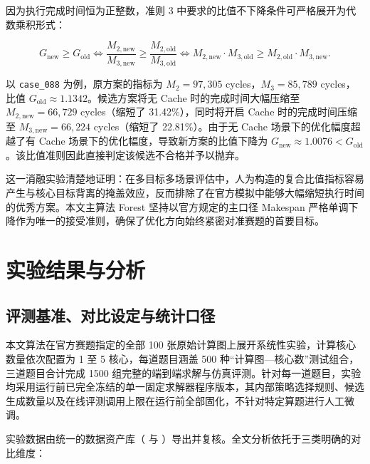 \documentclass[anonymous,notoc]{gmcm2026}
\begin{document}
因为执行完成时间恒为正整数，准则 3 中要求的比值不下降条件可严格展开为代数乘积形式：

\begin{equation}
G_{\mathrm{new}} \ge G_{\mathrm{old}} \iff \frac{M_{2, \mathrm{new}}}{M_{3, \mathrm{new}}} \ge \frac{M_{2, \mathrm{old}}}{M_{3, \mathrm{old}}} \iff M_{2, \mathrm{new}} \cdot M_{3, \mathrm{old}} \ge M_{2, \mathrm{old}} \cdot M_{3, \mathrm{new}}.
\end{equation}

以 \texttt{case\_088} 为例，原方案的指标为 \(M_2 = 97{,}305\) cycles，\(M_3 = 85{,}789\) cycles，比值 \(G_{\mathrm{old}} \approx 1.1342\)。候选方案将无 Cache 时的完成时间大幅压缩至 \(M_{2, \mathrm{new}} = 66{,}729\) cycles（缩短了 31.42\%），同时将开启 Cache 时的完成时间压缩至 \(M_{3, \mathrm{new}} = 66{,}224\) cycles（缩短了 22.81\%）。由于无 Cache 场景下的优化幅度超越了有 Cache 场景下的优化幅度，导致新方案的比值下降为 \(G_{\mathrm{new}} \approx 1.0076 < G_{\mathrm{old}}\)。该比值准则因此直接判定该候选不合格并予以抛弃。

这一消融实验清楚地证明：在多目标多场景评估中，人为构造的复合比值指标容易产生与核心目标背离的掩盖效应，反而排除了在官方模拟中能够大幅缩短执行时间的优秀方案。本文主算法 Forest 坚持以官方规定的主口径 Makespan 严格单调下降作为唯一的接受准则，确保了优化方向始终紧密对准赛题的首要目标。


\section{实验结果与分析}

\subsection{评测基准、对比设定与统计口径}

本文算法在官方赛题指定的全部 100 张原始计算图上展开系统性实验，计算核心数量依次配置为 1 至 5 核心，每道题目涵盖 500 种``计算图---核心数''测试组合，三道题目合计完成 1500 组完整的端到端求解与仿真评测。针对每一道题目，实验均采用运行前已完全冻结的单一固定求解器程序版本，其内部策略选择规则、候选生成数量以及在线评测调用上限在运行前全部固化，不针对特定算题进行人工微调。

实验数据由统一的数据资产库（\texttt{} 与 \texttt{}）导出并复核。全文分析依托于三类明确的对比维度：
\end{document}

